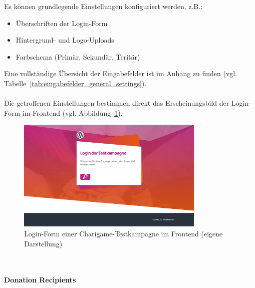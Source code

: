 Es können grundlegende Einstellungen konfiguriert werden, z.B.:
\begin{itemize}
\item Überschriften der Login-Form
\item Hintergrund- und Logo-Uploads
\item Farbschema (Primär, Sekundär, Teritär)
\end{itemize}
Eine vollständige Übersicht der Eingabefelder ist im Anhang zu finden (vgl. Tabelle~\ref{tab:eingabefelder_general_settings}).
\\\\
Die getroffenen Einstellungen bestimmen direkt das Erscheinungsbild der Login-Form im Frontend (vgl. Abbildung~\ref{fig:login-textkampagne}).

\begin{figure}[H]
    \centering
    \includegraphics[width=0.8\textwidth]{images/legacy_login_testkampagne}
    \caption{Login-Form einer Charigame-Testkampagne im Frontend (eigene Darstellung)}
    \label{fig:login-textkampagne}
\end{figure}
\\\\
\textbf{Donation Recipients}

